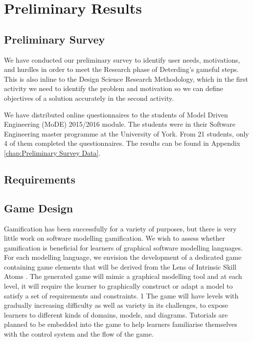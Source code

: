 \documentclass[12pt, a4paper]{report}
\begin{document}
\chapter{Preliminary Results}

\section{Preliminary Survey}
We have conducted our preliminary survey to identify user needs, motivations, and hurdles in order to meet the Research phase of Deterding's gameful steps. This is also inline to the Design Science Research Methodology, which in the first activity we need to identify the problem and motivation so we can define objectives of a solution accurately in the second activity. 

We have distributed online questionnaires to the students of Model Driven Engineering (MoDE) 2015/2016 module. The students were in their Software Engineering master programme at the University of York. From 21 students, only 4 of them completed the questionnaires. The results can be found in Appendix  \autoref{chap:Preliminary Survey Data}.

\section{Requirements}


\section{Game Design}
Gamification has been successfully for a variety of purposes, but there is very little work on software modelling gamification. We wish to assess whether gamification is beneficial for learners of graphical software modelling languages. For each modelling language, we envision the development of a dedicated game containing game elements that will be derived from the Lens of Intrinsic Skill Atoms \cite{deterding2015lens}. The generated game will mimic a graphical modelling tool and at each level, it will require the learner to graphically construct or adapt a model to satisfy a set of requirements and constraints.
	1
The game will have levels with gradually increasing difficulty as well as variety in its challenges, to expose learners to different kinds of domains, models, and diagrams. Tutorials are planned to be embedded into the game to help learners familiarise themselves with the control system and the flow of the game. 
\end{document}
